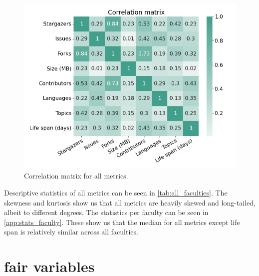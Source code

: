 \begin{figure}[tbph!]
\centerline{
\includegraphics[scale=0.5]{figures_results/heatmap_correlation_numeric.png}}
\caption{Correlation matrix for all metrics.
\vspace{-0.3cm}
\label{fig:heatmap_correlation_numeric}}
\end{figure}
\vspace{-0.3cm}

Descriptive statistics of all metrics can be seen in \autoref{tab:all_faculties}. The skewness and kurtosis show us that all metrics are heavily skewed and long-tailed, albeit to different degrees. The statistics per faculty can be seen in \autoref{app:stats_faculty}. These show us that the median for all metrics except life span is relatively similar across all faculties.






\newpage
\section{\acrshort{fair} variables}
\label{sec:res_fair}

